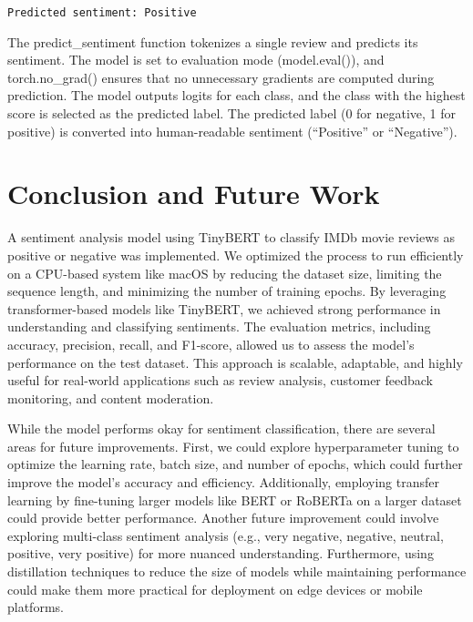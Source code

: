 \documentclass[11pt]{article}
\begin{document}
    \begin{Verbatim}[commandchars=\\\{\}]
Predicted sentiment: Positive
    \end{Verbatim}

    The predict\_sentiment function tokenizes a single review and predicts
its sentiment. The model is set to evaluation mode (model.eval()), and
torch.no\_grad() ensures that no unnecessary gradients are computed
during prediction. The model outputs logits for each class, and the
class with the highest score is selected as the predicted label. The
predicted label (0 for negative, 1 for positive) is converted into
human-readable sentiment (``Positive'' or ``Negative'').

    \section{Conclusion and Future Work}\label{conclusion-and-future-work}

    A sentiment analysis model using TinyBERT to classify IMDb movie reviews
as positive or negative was implemented. We optimized the process to run
efficiently on a CPU-based system like macOS by reducing the dataset
size, limiting the sequence length, and minimizing the number of
training epochs. By leveraging transformer-based models like TinyBERT,
we achieved strong performance in understanding and classifying
sentiments. The evaluation metrics, including accuracy, precision,
recall, and F1-score, allowed us to assess the model's performance on
the test dataset. This approach is scalable, adaptable, and highly
useful for real-world applications such as review analysis, customer
feedback monitoring, and content moderation.

While the model performs okay for sentiment classification, there are
several areas for future improvements. First, we could explore
hyperparameter tuning to optimize the learning rate, batch size, and
number of epochs, which could further improve the model's accuracy and
efficiency. Additionally, employing transfer learning by fine-tuning
larger models like BERT or RoBERTa on a larger dataset could provide
better performance. Another future improvement could involve exploring
multi-class sentiment analysis (e.g., very negative, negative, neutral,
positive, very positive) for more nuanced understanding. Furthermore,
using distillation techniques to reduce the size of models while
maintaining performance could make them more practical for deployment on
edge devices or mobile platforms.
\end{document}
